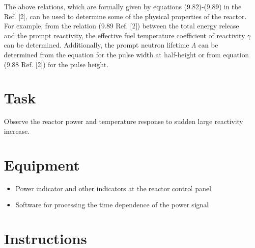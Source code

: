 \documentclass[a4paper,12pt]{article}
\begin{document}
The above relations, which are formally given by equations (9.82)-(9.89) in the Ref. [2], can be used to determine some of the physical properties of the reactor. For example, from the relation (9.89 Ref. [2]) between the total energy release and the prompt reactivity, the effective fuel temperature coefficient of reactivity $\gamma$ can be determined. Additionally, the prompt neutron lifetime $\Lambda$ can be determined from the equation for the pulse width at half-height or from equation (9.88 Ref. [2]) for the pulse height.


\section{Task}

Observe the reactor power and temperature response to sudden large reactivity increase.



\section{Equipment}

\begin{itemize}[noitemsep]
	\item Power indicator and other indicators at the reactor control panel
	\item Software for processing the time dependence of the power signal
\end{itemize}


\section{Instructions}
\end{document}
